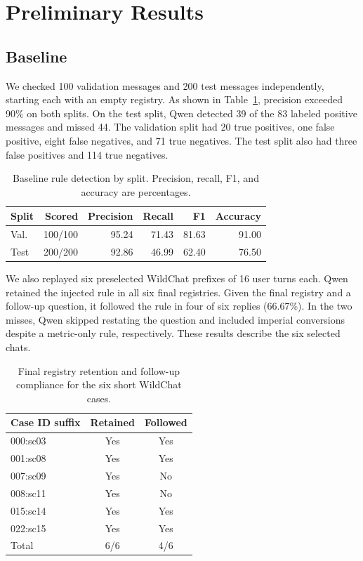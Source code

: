 \section{Preliminary Results}
\label{sec:results}

\subsection{Baseline}
\label{sec:baseline-results}
We checked 100 validation messages and 200 test messages independently,
starting each with an empty registry. As shown in
Table~\ref{tab:baseline-detection}, precision exceeded 90\% on both splits.
On the test split, Qwen detected 39 of the 83 labeled positive messages
and missed 44. The validation split had 20 true positives, one false
positive, eight false negatives, and 71 true negatives. The test split also had three false positives and 114 true negatives.

\begin{table}[t]
  \centering
  \small
  \caption{Baseline rule detection by split. Precision, recall, F1, and
  accuracy are percentages.}
  \label{tab:baseline-detection}
  \begin{tabular}{@{}lrrrrr@{}}
    \toprule
    Split & Scored & Precision & Recall & F1 & Accuracy \\
    \midrule
    Val. & 100/100 & 95.24 & 71.43 & 81.63 & 91.00 \\
    Test & 200/200 & 92.86 & 46.99 & 62.40 & 76.50 \\
    \bottomrule
  \end{tabular}
\end{table}

We also replayed six preselected WildChat prefixes of 16 user turns each.
Qwen retained the injected rule in all six final registries. Given the final
registry and a follow-up question, it followed the rule in four of six
replies (66.67\%). In the two misses, Qwen skipped restating the question and
included imperial conversions despite a metric-only rule, respectively.
These results describe the six selected chats.

\begin{table}[t]
  \centering
  \small
  \caption{Final registry retention and follow-up compliance for the six
  short WildChat cases.}
  \label{tab:baseline-retention}
  \begin{tabular}{@{}lcc@{}}
    \toprule
    Case ID suffix & Retained & Followed \\
    \midrule
    000:sc03 & Yes & Yes \\
    001:sc08 & Yes & Yes \\
    007:sc09 & Yes & No \\
    008:sc11 & Yes & No \\
    015:sc14 & Yes & Yes \\
    022:sc15 & Yes & Yes \\
    \midrule
    Total & 6/6 & 4/6 \\
    \bottomrule
  \end{tabular}
\end{table}

